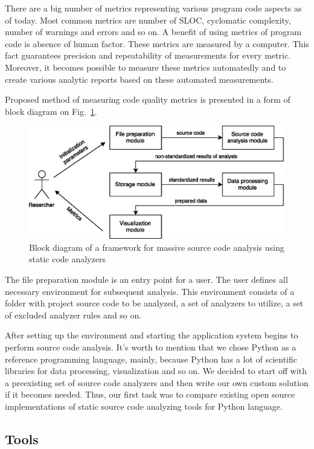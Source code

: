 \documentclass[runningheads,a4paper]{llncs}
\begin{document}
There are a big number of metrics representing various program code aspects
as of today. Most common metrics are number of SLOC, cyclomatic complexity,
number of warnings and errors and so on. A benefit of using metrics of program
code is absence of human factor. These metrics are measured by a computer.
This fact guarantees precision and repeatability of measurements for every
metric. Moreover, it becomes possible to measure these metrics automatedly
and to create various analytic reports based on these automated measurements.

Proposed method of measuring code quality metrics is presented in a form of
block diagram on Fig.~\ref{fig:structscheme}.

%
\begin{figure}
	\centering
	\includegraphics[width=\linewidth]{structscheme}
	\caption{Block diagram of a framework for massive source code analysis using static code analyzers}
	\label{fig:structscheme}
\end{figure}
%

The file preparation module is an entry point for a user. The user defines
all necessary environment for subsequent analysis. This environment consists
of a folder with project source code to be analyzed, a set of analyzers
to utilize, a set of excluded analyzer rules and so on.

After setting up the environment and starting the application system begins
to perform source code analysis. It's worth to mention that we chose Python
as a reference programming language, mainly, because Python has a lot of
scientific libraries for data processing, visualization and so on. We decided
to start off with a preexisting set of source code analyzers and then write
our own custom solution if it becomes needed. Thus, our first task was to
compare existing open source implementations of static source code
analyzing tools for Python language.

\subsection{Tools}
\end{document}
